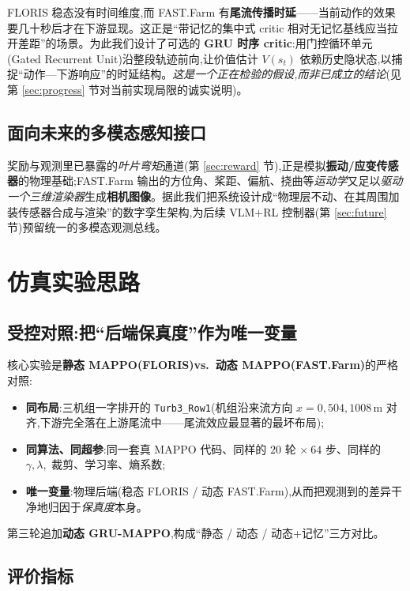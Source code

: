\documentclass[12pt,a4paper]{article}
\theoremstyle{definition}
\theoremstyle{plain}
\begin{document}
FLORIS 稳态没有时间维度,而 FAST.Farm 有\textbf{尾流传播时延}——当前动作的效果要几十秒后才在下游显现。这正是“带记忆的集中式 critic 相对无记忆基线应当拉开差距”的场景。为此我们设计了可选的 \textbf{GRU 时序 critic}:用门控循环单元(Gated Recurrent Unit)沿整段轨迹前向,让价值估计 $V(s_t)$ 依赖历史隐状态,以捕捉“动作—下游响应”的时延结构。\emph{这是一个正在检验的假设,而非已成立的结论}(见第 \ref{sec:progress} 节对当前实现局限的诚实说明)。

\subsection{面向未来的多模态感知接口}

奖励与观测里已暴露的\emph{叶片弯矩}通道(第 \ref{sec:reward} 节),正是模拟\textbf{振动/应变传感器}的物理基础;FAST.Farm 输出的方位角、桨距、偏航、挠曲等\emph{运动学}又足以\emph{驱动一个三维渲染器}生成\textbf{相机图像}。据此我们把系统设计成“物理层不动、在其周围加装传感器合成与渲染”的数字孪生架构,为后续 VLM$+$RL 控制器(第 \ref{sec:future} 节)预留统一的多模态观测总线。

\section{仿真实验思路}
\label{sec:exp}

\subsection{受控对照:把“后端保真度”作为唯一变量}

核心实验是\textbf{静态 MAPPO(FLORIS)vs.\ 动态 MAPPO(FAST.Farm)}的严格对照:
\begin{itemize}[leftmargin=1.5em,itemsep=1pt]
  \item \textbf{同布局}:三机组一字排开的 \texttt{Turb3\_Row1}(机组沿来流方向 $x=0,504,1008$\,m 对齐,下游完全落在上游尾流中——尾流效应最显著的最坏布局);
  \item \textbf{同算法、同超参}:同一套真 MAPPO 代码、同样的 $20$ 轮 $\times\ 64$ 步、同样的 $\gamma,\lambda,$ 裁剪、学习率、熵系数;
  \item \textbf{唯一变量}:物理后端(稳态 FLORIS / 动态 FAST.Farm),从而把观测到的差异干净地归因于\emph{保真度}本身。
\end{itemize}
第三轮追加\textbf{动态 GRU-MAPPO},构成“静态 / 动态 / 动态+记忆”三方对比。

\subsection{评价指标}
\end{document}
